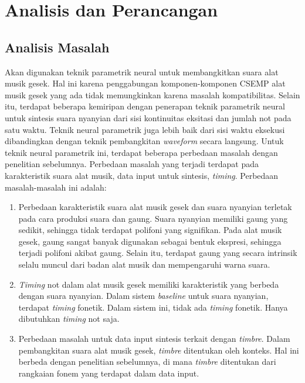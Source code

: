 \chapter{Analisis dan Perancangan} \label{design-chapter}

\section{Analisis Masalah}\label{section-problem-analysis}

Akan digunakan teknik parametrik neural untuk membangkitkan suara alat musik gesek. Hal ini karena penggabungan komponen-komponen CSEMP alat musik gesek yang ada tidak memungkinkan karena masalah kompatibilitas. Selain itu, terdapat beberapa kemiripan dengan penerapan teknik parametrik neural untuk sintesis suara nyanyian dari sisi kontinuitas eksitasi dan jumlah not pada satu waktu. Teknik neural parametrik juga lebih baik dari sisi waktu eksekusi dibandingkan dengan teknik pembangkitan \textit{waveform} secara langsung. Untuk teknik neural parametrik ini, terdapat beberapa perbedaan masalah dengan penelitian sebelumnya\parencite{bonada2017singing}. Perbedaan masalah yang terjadi terdapat pada karakteristik suara alat musik, data input untuk sintesis, \textit{timing}. Perbedaan masalah-masalah ini adalah:

\begin{enumerate}

\item Perbedaan karakteristik suara alat musik gesek dan suara nyanyian terletak pada cara produksi suara dan gaung. Suara nyanyian memiliki gaung yang sedikit, sehingga tidak terdapat polifoni yang signifikan. Pada alat musik gesek, gaung sangat banyak digunakan sebagai bentuk ekspresi, sehingga terjadi polifoni akibat gaung. Selain itu, terdapat gaung yang secara intrinsik selalu muncul dari badan alat musik dan mempengaruhi warna suara.

\item \textit{Timing} not dalam alat musik gesek memiliki karakteristik yang berbeda dengan suara nyanyian. Dalam sistem \textit{baseline} untuk suara nyanyian, terdapat \textit{timing} fonetik. Dalam sistem ini, tidak ada \textit{timing} fonetik. Hanya dibutuhkan \textit{timing} not saja.

\item Perbedaan masalah untuk data input sintesis terkait dengan \textit{timbre}. Dalam pembangkitan suara alat musik gesek, \textit{timbre} ditentukan oleh konteks. Hal ini berbeda dengan penelitian sebelumnya, di mana \textit{timbre} ditentukan dari rangkaian fonem yang terdapat dalam data input.

\end{enumerate}


